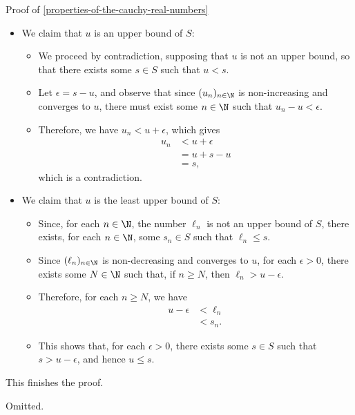 \begin{Proof}{Proof of \cref{properties-of-the-cauchy-real-numbers}}
\begin{itemize}
\begin{itemize}
                    so $(\ell_{n})_{n\in\N}$ converges to $u$.
            \end{itemize}
        \item We claim that $u$ is an upper bound of $S$:
            \begin{itemize}
                \item We proceed by contradiction, supposing that $u$ is not an upper bound, so that there exists some $s\in S$ such that $u\less s$.
                \item Let $\epsilon=s-u$, and observe that since $(u_{n})_{n\in\N}$ is non-increasing and converges to $u$, there must exist some $n\in\N$ such that $u_{n}-u\less\epsilon$.
                \item Therefore, we have $u_{n}\less u+\epsilon$, which gives
                    \begin{align*}
                        u_{n} &\less u+\epsilon\\
                              &=     u+s-u\\
                              &=     s,
                    \end{align*}
                    which is a contradiction.
            \end{itemize}
        \item We claim that $u$ is the least upper bound of $S$:
            \begin{itemize}
                \item Since, for each $n\in\N$, the number $\ell_{n}$ is not an upper bound of $S$, there exists, for each $n\in\N$, some $s_{n}\in S$ such that $\ell_{n}\leq s$.
                \item Since $(\ell_{n})_{n\in\N}$ is non-decreasing and converges to $u$, for each $\epsilon\greater0$, there exists some $N\in\N$ such that, if $n\geq N$, then $\ell_{n}\greater u-\epsilon$.
                \item Therefore, for each $n\geq N$, we have
                    \begin{align*}
                        u-\epsilon &\less \ell_{n}\\
                                   &\less s_{n}.
                    \end{align*}
                \item This shows that, for each $\epsilon\greater0$, there exists some $s\in S$ such that $s\greater u-\epsilon$, and hence $u\leq s$.
            \end{itemize}
    \end{itemize}
    This finishes the proof.

    Omitted.
\end{Proof}
